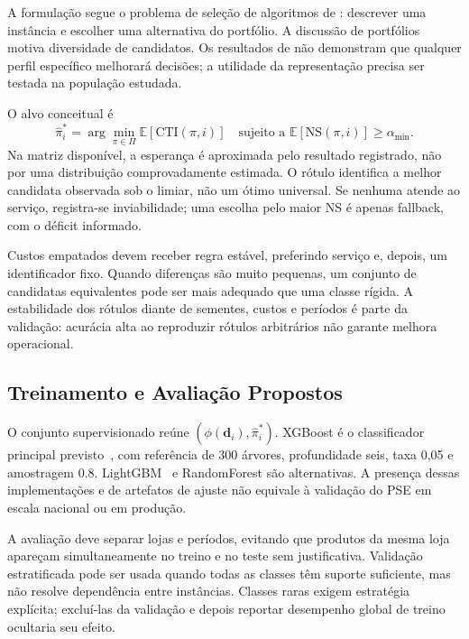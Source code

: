 A formulação segue o problema de seleção de algoritmos de \citet{Rice1976AlgorithmSelection}: descrever uma instância e escolher uma alternativa do portfólio. A discussão de portfólios~\citep{Huberman1997AlgorithmPortfolios} motiva diversidade de candidatos. Os resultados de \citet{Wolpert1997NoFreeLunch} não demonstram que qualquer perfil específico melhorará decisões; a utilidade da representação precisa ser testada na população estudada.

O alvo conceitual é
\begin{equation}
\hat\pi_i^*=\arg\min_{\pi\in\Pi}\mathbb E[\mathrm{CTI}(\pi,i)]
\quad\text{sujeito a }\mathbb E[\mathrm{NS}(\pi,i)]\geq\alpha_{\min}.
\label{eq:policy_selector}
\end{equation}
Na matriz disponível, a esperança é aproximada pelo resultado registrado, não por uma distribuição comprovadamente estimada. O rótulo identifica a melhor candidata observada sob o limiar, não um ótimo universal. Se nenhuma atende ao serviço, registra-se inviabilidade; uma escolha pelo maior NS é apenas fallback, com o déficit informado.

Custos empatados devem receber regra estável, preferindo serviço e, depois, um identificador fixo. Quando diferenças são muito pequenas, um conjunto de candidatas equivalentes pode ser mais adequado que uma classe rígida. A estabilidade dos rótulos diante de sementes, custos e períodos é parte da validação: acurácia alta ao reproduzir rótulos arbitrários não garante melhora operacional.

\subsection{Treinamento e Avaliação Propostos}

O conjunto supervisionado reúne $(\phi(\mathbf d_i),\hat\pi_i^*)$. XGBoost é o classificador principal previsto~\citep{ChenGuestrin2016XGBoost}, com referência de 300 árvores, profundidade seis, taxa 0,05 e amostragem 0.8. LightGBM~\citep{Ke2017LightGBM} e RandomForest são alternativas. A presença dessas implementações e de artefatos de ajuste não equivale à validação do PSE em escala nacional ou em produção.

A avaliação deve separar lojas e períodos, evitando que produtos da mesma loja apareçam simultaneamente no treino e no teste sem justificativa. Validação estratificada pode ser usada quando todas as classes têm suporte suficiente, mas não resolve dependência entre instâncias. Classes raras exigem estratégia explícita; excluí-las da validação e depois reportar desempenho global de treino ocultaria seu efeito.

